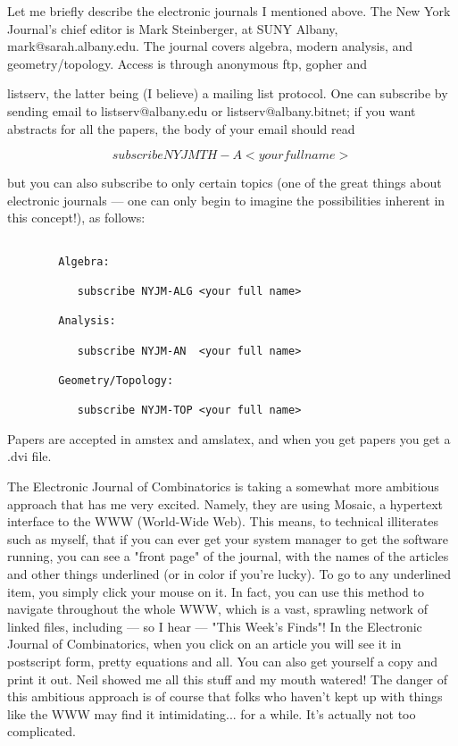 Let me briefly describe the electronic journals I mentioned above.  The
New York Journal's chief editor is Mark Steinberger, at SUNY Albany,
mark@sarah.albany.edu.  The journal covers algebra, modern analysis, and
geometry/topology.  Access is through anonymous ftp, gopher and





listserv, the latter being (I believe) a mailing list protocol.  One can
subscribe by sending email to listserv@albany.edu or
listserv@albany.bitnet; if you want abstracts for all the papers, the
body of your email should read


$$

           subscribe NYJMTH-A <your full name>
$$
    

but you can also subscribe to only certain topics (one of the great
things about electronic journals --- one can only begin to imagine the
possibilities inherent in this concept!), as follows:


\begin{verbatim}

        Algebra:

           subscribe NYJM-ALG <your full name>

        Analysis:

           subscribe NYJM-AN  <your full name>

        Geometry/Topology:

           subscribe NYJM-TOP <your full name>
\end{verbatim}
    

Papers are accepted in amstex and amslatex, and when you get papers you
get a .dvi file.  

The Electronic Journal of Combinatorics is taking a somewhat more
ambitious approach that has me very excited.  Namely, they are using
Mosaic, a hypertext interface to the WWW (World-Wide Web).  This means,
to technical illiterates such as myself, that if you can ever get your
system manager to get the software running, you can see a "front page"
of the journal, with the names of the articles and other things
underlined (or in color if you're lucky).  To go to any underlined item,
you simply click your mouse on it.  In fact, you can use this method to
navigate throughout the whole WWW, which is a vast, sprawling network of
linked files, including --- so I hear --- "This Week's Finds"!  In the
Electronic Journal of Combinatorics, when you click on an article you
will see it in postscript form, pretty equations and all.  You can also
get yourself a copy and print it out.  Neil showed me all this stuff and
my mouth watered!   The danger of this ambitious approach is of course
that folks who haven't kept up with things like the WWW may find it
intimidating... for a while.  It's actually not too complicated.

